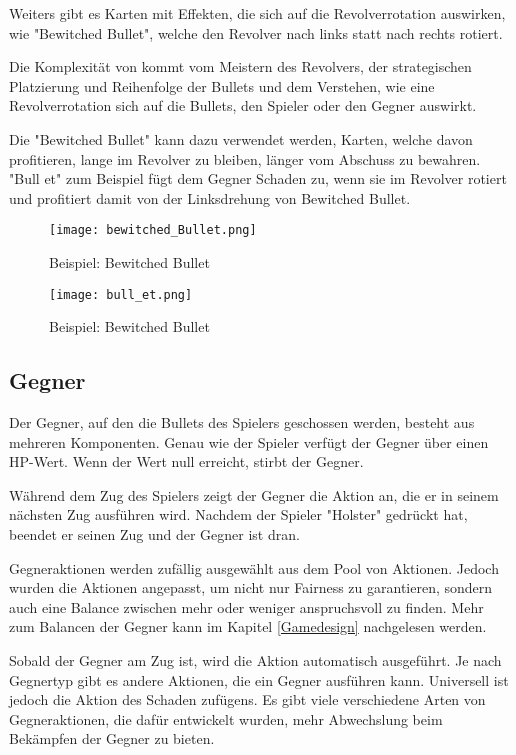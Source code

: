 Weiters gibt es Karten mit Effekten, die sich auf die Revolverrotation auswirken, wie \zB "Bewitched Bullet",
welche den Revolver nach links statt nach rechts rotiert.


Die Komplexität von \FF kommt vom Meistern des Revolvers, der strategischen Platzierung und Reihenfolge der Bullets und dem Verstehen,
wie eine Revolverrotation sich auf die Bullets, den Spieler oder den Gegner auswirkt.


Die "Bewitched Bullet" kann \zB dazu verwendet werden, Karten,
welche davon profitieren, lange im Revolver zu bleiben, länger vom Abschuss zu bewahren. "Bull et" zum Beispiel fügt dem Gegner Schaden zu,
wenn sie im Revolver rotiert und profitiert damit von der Linksdrehung von Bewitched Bullet.


\begin{figure}[H]
    \texttt{[image: bewitched\_Bullet.png]}
    \caption{Beispiel: Bewitched Bullet}
\end{figure}

\begin{figure}[H]
    \texttt{[image: bull\_et.png]}
    \caption{Beispiel: Bewitched Bullet}
\end{figure}


\subsection{Gegner}\label{gegner}
Der Gegner, auf den die Bullets des Spielers geschossen werden, besteht aus mehreren Komponenten.
Genau wie der Spieler verfügt der Gegner über einen HP-Wert. Wenn der Wert null erreicht, stirbt der Gegner.


Während dem Zug des Spielers zeigt der Gegner die Aktion an, die er in seinem nächsten Zug ausführen wird.
Nachdem der Spieler "Holster" gedrückt hat, beendet er seinen Zug und der Gegner ist dran.

Gegneraktionen werden zufällig ausgewählt aus dem Pool von Aktionen.
Jedoch wurden die Aktionen angepasst, um nicht nur Fairness zu garantieren,
sondern auch eine Balance zwischen mehr oder weniger anspruchsvoll zu finden.
Mehr zum Balancen der Gegner kann im Kapitel \ref{Gamedesign} nachgelesen werden.


Sobald der Gegner am Zug ist, wird die Aktion automatisch ausgeführt. Je nach Gegnertyp gibt es andere Aktionen,
die ein Gegner ausführen kann. Universell ist jedoch die Aktion des Schaden zufügens.
Es gibt viele verschiedene Arten von Gegneraktionen, die dafür entwickelt wurden, mehr Abwechslung beim Bekämpfen der Gegner zu bieten.

